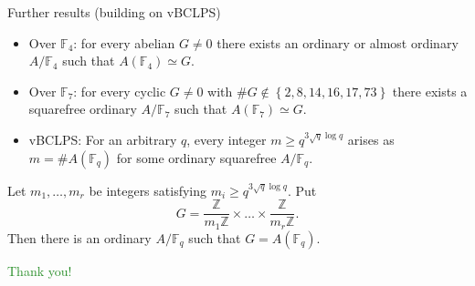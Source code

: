 \documentclass[usenames,dvipsnames,handout]{beamer}
\def\Z{\mathbb{Z}}
\def\F{\mathbb{F}}
\newcommand{\set}[1]{\left\lbrace#1\right\rbrace }
\newcommand{\green}[1]{\textcolor{ForestGreen}{#1}}
\begin{document}
\begin{frame}{ Further results (building on vBCLPS) }
	\begin{itemize}
        \pause
        \item Over $\F_4$: for every abelian $G\neq 0$ there exists an ordinary or almost ordinary $A/\F_4$ such that $A(\F_4)\simeq G$.
        \pause
        \item Over $\F_7$: for every cyclic $G\neq 0$ with $\# G\not \in \set{2,8,14,16,17,73}$ there exists a squarefree ordinary $A/\F_7$ such that $A(\F_7)\simeq G$.
        \pause
        \item vBCLPS: For an arbitrary $q$, every integer $m\geq q^{3\sqrt{q}\log q}$ arises as $m=\#A(\F_q)$ for some ordinary squarefree $A/\F_q$.
	\end{itemize}
    \pause
    \begin{theorem}[M.-Springer]
        Let $m_1,\ldots,m_r$ be integers satisfying $m_i\geq q^{3\sqrt{q}\log q}$.
        Put
        \[ G=\frac{\Z}{m_1 \Z}\times \ldots \times \frac{\Z}{m_r \Z}. \]
        \pause
        Then there is an ordinary $A/\F_q$ such that $G=A(\F_q)$.
    \end{theorem}
\end{frame}

\begin{frame}{ }
    \begin{center}
        \green{\huge Thank you!}
    \end{center}
\end{frame}
\end{document}
